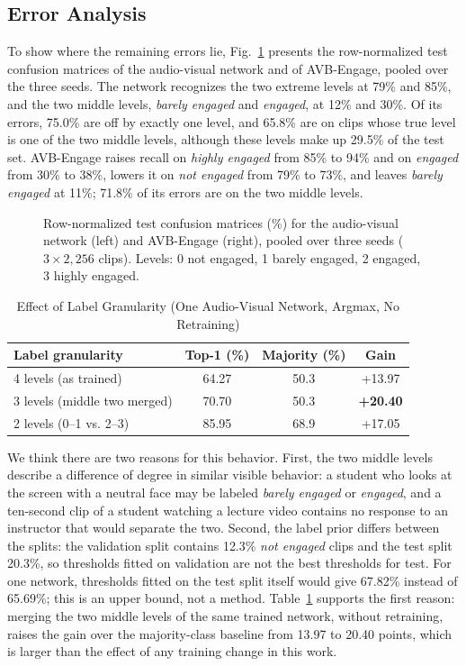 \documentclass[journal]{IEEEtran}
\newcommand{\ournet}{AVB-Engage}
\begin{document}
\subsection{Error Analysis}

To show where the remaining errors lie, Fig.~\ref{fig_confusion} presents the row-normalized test confusion matrices of the audio-visual network and of \ournet, pooled over the three seeds. The network recognizes the two extreme levels at 79\% and 85\%, and the two middle levels, \emph{barely engaged} and \emph{engaged}, at 12\% and 30\%. Of its errors, 75.0\% are off by exactly one level, and 65.8\% are on clips whose true level is one of the two middle levels, although these levels make up 29.5\% of the test set. \ournet{} raises recall on \emph{highly engaged} from 85\% to 94\% and on \emph{engaged} from 30\% to 38\%, lowers it on \emph{not engaged} from 79\% to 73\%, and leaves \emph{barely engaged} at 11\%; 71.8\% of its errors are on the two middle levels.

\begin{figure}[!t]
\centering

\caption{Row-normalized test confusion matrices (\%) for the audio-visual network (left) and \ournet{} (right), pooled over three seeds ($3 \times 2{,}256$ clips). Levels: 0 not engaged, 1 barely engaged, 2 engaged, 3 highly engaged.}
\label{fig_confusion}
\end{figure}

\begin{table}[!t]
\setlength{\tabcolsep}{3pt}
\renewcommand{\arraystretch}{1.2}
\caption{Effect of Label Granularity (One Audio-Visual Network, Argmax, No Retraining)}
\label{tab_granularity}
\centering
\begin{tabular}{lccc}
\hline
Label granularity & Top-1 (\%) & Majority (\%) & Gain\\
\hline
4 levels (as trained) & 64.27 & 50.3 & +13.97\\
3 levels (middle two merged) & 70.70 & 50.3 & \textbf{+20.40}\\
2 levels (0--1 vs. 2--3) & 85.95 & 68.9 & +17.05\\
\hline
\end{tabular}
\end{table}

We think there are two reasons for this behavior. First, the two middle levels describe a difference of degree in similar visible behavior: a student who looks at the screen with a neutral face may be labeled \emph{barely engaged} or \emph{engaged}, and a ten-second clip of a student watching a lecture video contains no response to an instructor that would separate the two. Second, the label prior differs between the splits: the validation split contains 12.3\% \emph{not engaged} clips and the test split 20.3\%, so thresholds fitted on validation are not the best thresholds for test. For one network, thresholds fitted on the test split itself would give 67.82\% instead of 65.69\%; this is an upper bound, not a method. Table~\ref{tab_granularity} supports the first reason: merging the two middle levels of the same trained network, without retraining, raises the gain over the majority-class baseline from 13.97 to 20.40 points, which is larger than the effect of any training change in this work.
\end{document}
